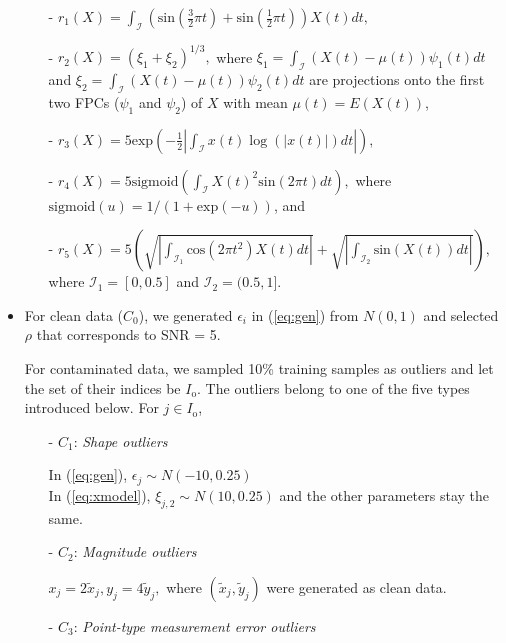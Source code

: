 \documentclass{article}
\let\oldref\ref
\renewcommand{\ref}[1]{(\oldref{#1})}
\begin{document}
\begin{itemize}
\begin{itemize}
\item[- ]  $r_1(X) =  \int_{\mathcal{I}} \left (\text{sin} \left(\frac{3}{2} \pi t \right) +  \text{sin} \left(\frac{1}{2} \pi t \right)\right)X(t)dt,$
\item[- ]  $r_2(X) = (\xi_1 + \xi_2)^{1/3},$ where  $\xi_1 = \int_{\mathcal{I}} (X(t) - \mu(t))\psi_1(t) dt$ and $\xi_2 = \int_{\mathcal{I}} (X(t) - \mu(t))\psi_2(t) dt$ are projections onto the first two FPCs ($\psi_1$ and $\psi_2$) of $X$ with mean $\mu(t) = E(X(t))$, 
\item[- ]  $r_3(X) = 5\text{exp}\left (- \frac{1}{2}\left| \int_{\mathcal{I}} x(t)\log(|x(t)|)dt \right| \right),$
\item[- ] 
$r_4(X) = 5\text{sigmoid}\left(\int_{\mathcal{I}}X(t)^2 \text{sin}(2\pi t) dt \right),$ where  $\text{sigmoid}(u) = 1/(1+ \text{exp}(-u))$, and
\item[- ] 
$r_5(X) = 5 \left( \sqrt{\left|\int_{\mathcal{I}_1} \text{cos}(2\pi t^2) X(t) dt \right|} + \sqrt{\left|\int_{\mathcal{I}_2} \text{sin}(X(t)) dt \right|} \right), $ where  $\mathcal{I}_1 = [0,0.5]$ and $\mathcal{I}_2 = (0.5,1]$. 
\end{itemize}

\item For clean data ($C_0$), we generated $\epsilon_i$ in \ref{eq:gen} from $N(0,1)$ and selected $\rho$ that corresponds to SNR = 5. 

For contaminated data, we sampled 10\% training samples as outliers and let the set of their indices be $I_{\text{o}}$. The outliers belong to  one of the five types introduced below. For $j \in I_{\text{o}}$, 
\begin{itemize}
    \item[- ] $C_1$: \textit{Shape outliers}
    
    \vspace{1ex}
    In \ref{eq:gen}, $\epsilon_j \sim N(-10, 0.25)$ \\
    In \ref{eq:xmodel},   $\xi_{j,2} \sim N(10, 0.25)$ and the other parameters stay the same.  
       \vspace{1ex}
    \item[- ] $C_2$: \textit{Magnitude outliers}     \vspace{1ex}
    
    $x_{j} = 2 \tilde{x}_{j}, y_{j} =  4 \tilde{y}_{j},$ where $(\tilde{x}_j, \tilde{y}_j)$ were generated as clean data.
       \vspace{1ex}
    \item[- ] $C_3$: \textit{Point-type measurement error outliers} 
    

\end{itemize}
\end{itemize}
\end{document}
